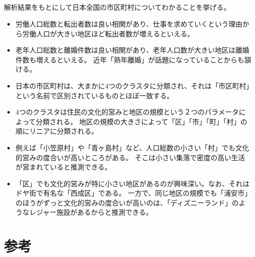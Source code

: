 \documentclass[a4paper,xelatex,ja=standard,jafont=hiragino-pron, 10pt]{bxjsarticle}
\begin{document}
\subsection{}

解析結果をもとにして日本全国の市区町村についてわかることを挙げる。

\begin{itemize}
  \item
    労働人口総数と転出者数は良い相関があり、仕事を求めていくという理由から労働人口が大きい地区ほど転出者数が増えるといえる。
  \item
    老年人口総数と離婚件数は良い相関があり、老年人口数が大きい地区は離婚件数も増えるといえる。
    近年「熟年離婚」が話題になっていることからも頷ける。
  \item
    日本の市区町村は、大まかに4つのクラスタに分類され、それは「市区町村」という名前で区別されているものとほぼ一致する。
  \item
    4つのクラスタは住民の文化的営みと地区の規模という２つのパラメータによって分類される。
    地区の規模の大きさによって「区」「市」「町」「村」の順にリニアに分類される。
  \item
    例えば「小笠原村」や「青ヶ島村」など、人口総数の小さい「村」でも文化的営みの度合いが高いところがある。
    そこは小さい集落で密度の高い生活が営まれていると推測できる。
  \item
    「区」でも文化的営みが特に小さい地区があるのが興味深い。なお、それはドヤ街で有名な「西成区」である。
    一方で、同じ地区の規模でも「浦安市」のほうがずっと文化的営みの度合いが高いのは、「ディズニーランド」のようなレジャー施設があるからと推測できる。
\end{itemize}

\section*{参考}

\end{document}
